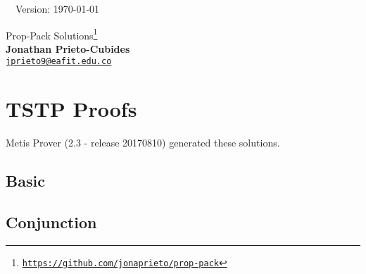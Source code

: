 \documentclass[12pt]{article}
\newcommand{\solutiontstp}[2][c]{}
\begin{document}

\hrulefill\ \ Version: \today\\

\vspace{3mm}
\begin{center}
{\Large Prop-Pack Solutions\footnote{
\href{https://github.com/jonaprieto/prop-pack}{{\color{blue(munsell)}
\texttt{https://github.com/jonaprieto/prop-pack}}}}
}\\
\textbf{Jonathan Prieto-Cubides}\\ %
\href{mailto:jprieto9@eafit.edu.co}{{\color{blue(munsell)}\texttt{jprieto9@eafit.edu.co}}}
\end{center}
\vspace{0.1 cm}

\tableofcontents

\section{TSTP Proofs}
Metis Prover (2.3 - release 20170810) generated these solutions.

\subsection{Basic}
\solutiontstp[basic-01.tptp]{problems/basic/basic-01.tstp}
\solutiontstp[basic-02.tptp]{problems/basic/basic-02.tstp}
\solutiontstp[basic-03.tptp]{problems/basic/basic-03.tstp}
\solutiontstp[basic-04.tptp]{problems/basic/basic-04.tstp}

\subsection{Conjunction}
\solutiontstp[conj-01.tptp]{problems/conjunction/conj-01.tstp}
\solutiontstp[conj-02.tptp]{problems/conjunction/conj-02.tstp}
\solutiontstp[conj-03.tptp]{problems/conjunction/conj-03.tstp}
\solutiontstp[conj-04.tptp]{problems/conjunction/conj-04.tstp}
\solutiontstp[conj-05.tptp]{problems/conjunction/conj-05.tstp}
\solutiontstp[conj-06.tptp]{problems/conjunction/conj-06.tstp}
\end{document}
